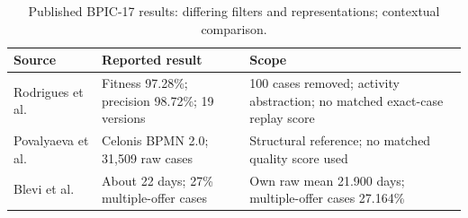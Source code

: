 \begin{table}[h!]
\centering
\small
\caption{Published BPIC-17 results: differing filters and representations; contextual comparison.}
\label{tab:published-comparison}
\begin{tabular}{@{}p{}p{}p{}@{}}
\toprule
Source & Reported result & Scope \\
\midrule
Rodrigues et al.~\cite{rodrigues2017stairway} & Fitness 97.28\%; precision 98.72\%; 19 versions & 100 cases removed; activity abstraction; no matched exact-case replay score \\
Povalyaeva et al.~\cite{povalyaeva2017density} & Celonis BPMN 2.0; 31,509 raw cases & Structural reference; no matched quality score used \\
Blevi et al.~\cite{blevi2017kpmg} & About 22 days; 27\% multiple-offer cases & Own raw mean 21.900 days; multiple-offer cases 27.164\% \\
\bottomrule
\end{tabular}
\end{table}
